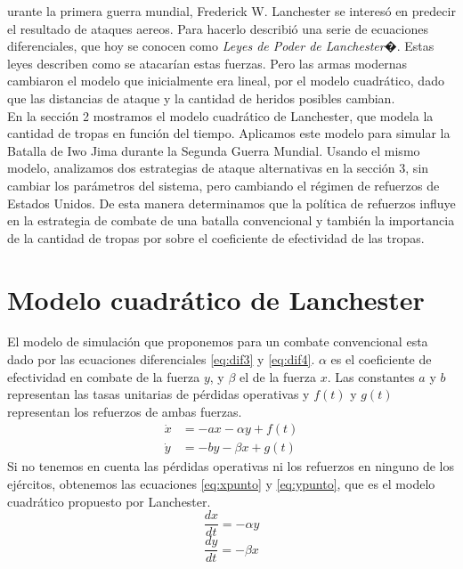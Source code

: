 \documentclass[10pt,journal,compsoc]{IEEEtran}
\begin{document}
% 
% 
% 
% 
urante la primera guerra mundial, Frederick W. Lanchester se interes\'o en predecir el
 resultado de ataques aereos.  Para hacerlo  describi\'o una serie de ecuaciones diferenciales, que hoy se
 conocen como \emph{Leyes de Poder de Lanchester}�. 
  Estas leyes describen como se atacar\'ian estas fuerzas.
  Pero las armas modernas cambiaron el modelo que inicialmente era lineal, por 
 el modelo cuadr\'atico, dado que las distancias de ataque y la cantidad de heridos posibles cambian.\\
\indent En la secci\'on 2 mostramos el modelo cuadr\'atico de Lanchester, que modela la cantidad de tropas en 
funci\'on del tiempo. 
 Aplicamos este modelo para simular la Batalla de Iwo Jima durante la Segunda Guerra Mundial.
Usando el mismo modelo, analizamos dos estrategias de ataque alternativas en la secci\'on 3, 
 sin cambiar los par\'ametros del sistema, pero cambiando el r\'egimen de refuerzos de Estados Unidos.
 De esta manera determinamos que la pol\'itica de refuerzos influye en la estrategia de combate de una
batalla convencional y tambi\'en la importancia de la cantidad de tropas por sobre el coeficiente de 
efectividad de las tropas.

\section{Modelo cuadr\'atico de Lanchester}
El modelo de simulaci\'on que proponemos para un combate convencional esta dado por las ecuaciones diferenciales
 {\ref{eq:dif3}} y  {\ref{eq:dif4}}. $\alpha$ es el coeficiente de efectividad en combate de la fuerza $y$, 
y $\beta$ el de la fuerza $x$. Las constantes $a$ y $b$ representan las tasas unitarias de p\'erdidas operativas y $f(t)$ y 
$g(t)$ representan los refuerzos de ambas fuerzas.
\begin{align}
\label{eq:dif3}
\dot{x} &= -ax -\alpha y + f(t) \\
\label{eq:dif4}
\dot{y} &= -by -\beta x + g(t)
\end{align}
Si no tenemos en cuenta las p\'erdidas operativas  ni los refuerzos en ninguno de los ej\'ercitos, obtenemos las 
ecuaciones {\ref{eq:xpunto}} y {\ref{eq:ypunto}}, que es el modelo cuadr\'atico propuesto por Lanchester.
\begin{equation}
\label{eq:xpunto}
 \frac{dx}{dt} = -\alpha y
\end{equation}
\begin{equation}
\label{eq:ypunto}
 \frac{dy}{dt} = -\beta x
\end{equation}
\end{document}
